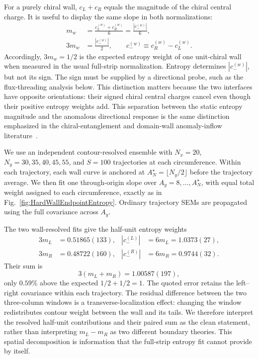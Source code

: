 \documentclass[aps,prb,twocolumn,superscriptaddress,longbibliography,floatfix]{revtex4-2}
\theoremstyle{plain}
\theoremstyle{definition}
\theoremstyle{remark}
\begin{document}
For a purely chiral wall, $c_L+c_R$ equals the magnitude of the chiral central
charge.  It is useful to display the same slope in both normalizations:
\begin{align}
 m_w&=\frac{c_L^{(w)}+c_R^{(w)}}{6}
 =\frac{|c_-^{(w)}|}{6},
 \nonumber\\
 3m_w&=\frac{|c_-^{(w)}|}{2},
 \qquad c_-^{(w)}\equiv c_R^{(w)}-c_L^{(w)}.
 \label{eq:WallChiralCentralChargeSlope}
\end{align}
Accordingly, $3m_w=1/2$ is the expected entropy weight of one unit-chiral
wall when measured in the usual full-strip normalization.  Entropy determines
$|c_-^{(w)}|$, but not its sign.  The sign must be supplied by a directional
probe, such as the flux-threading analysis below.  This distinction matters
because the two interfaces have opposite orientations: their signed chiral
central charges cancel even though their positive entropy weights add.  This
separation between the static entropy magnitude and the anomalous directional
response is the same distinction emphasized in the chiral-entanglement and
domain-wall anomaly-inflow literature~\cite{IqbalWall2016,HughesLeighParrikarRamamurthy2016}.

We use an independent contour-resolved ensemble with $N_x=20$,
$N_y=30,35,40,45,55$, and $S=100$ trajectories at each circumference.
Within each trajectory, each wall curve is anchored at
$A_N^\star=\lfloor N_y/2\rfloor$ before the trajectory average.  We then fit
one through-origin slope over $A_y=8,\ldots,A_N^\star$, with equal total
weight assigned to each circumference, exactly as in
Fig.~\ref{fig:HardWallEndpointEntropy}.  Ordinary trajectory SEMs are
propagated using the full covariance across $A_y$.

The two wall-resolved fits give the half-unit entropy weights
\begin{align}
 3m_L&=0.51865(133), & |c_-^{(L)}|&=6m_L=1.0373(27),
 \nonumber\\
 3m_R&=0.48722(160), & |c_-^{(R)}|&=6m_R=0.9744(32).
 \label{eq:WallResolvedChiralCentralCharges}
\end{align}
Their sum is
\begin{equation}
 3(m_L+m_R)=1.00587(197),
 \label{eq:WallAveragedChiralCentralCharge}
\end{equation}
only $0.59\%$ above the expected $1/2+1/2=1$.  The quoted error retains
the left--right covariance within each trajectory.  The residual difference
between the two three-column windows is a transverse-localization effect:
changing the window redistributes contour weight between the wall and its
tails.  We therefore interpret the resolved half-unit contributions and their
paired sum as the clean statement, rather than interpreting $m_L-m_R$ as two
different boundary theories.  This spatial decomposition is information that
the full-strip entropy fit cannot provide by itself.
\end{document}
